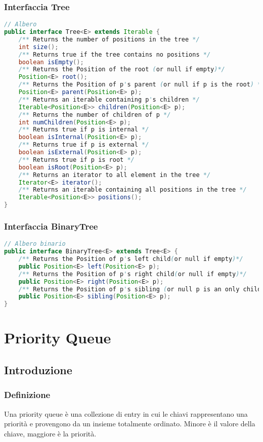 \documentclass[a4paper]{article}
\begin{document}
\subsubsection*{Interfaccia Tree}
\begin{lstlisting}[language=Java]
// Albero
public interface Tree<E> extends Iterable {
	/** Returns the number of positions in the tree */
	int size();
	/** Returns true if the tree contains no positions */
	boolean isEmpty();
	/** Returns the Position of the root (or null if empty)*/
	Position<E> root();
	/** Returns the Position of p's parent (or null if p is the root) */
	Position<E> parent(Position<E> p);
	/** Returns an iterable containing p's children */
	Iterable<Position<E>> children(Position<E> p);
	/** Returns the number of children of p */
	int numChildren(Position<E> p);
	/** Returns true if p is internal */
	boolean isInternal(Position<E> p);
	/** Returns true if p is external */
	boolean isExternal(Position<E> p);
	/** Returns true if p is root */
	boolean isRoot(Position<E> p);
	/** Returns an iterator to all element in the tree */
	Iterator<E> iterator();
	/** Returns an iterable containing all positions in the tree */
	Iterable<Position<E>> positions();
}
\end{lstlisting}

\subsubsection*{Interfaccia BinaryTree}
\begin{lstlisting}[language=Java]
// Albero binario
public interface BinaryTree<E> extends Tree<E> {
	/** Returns the Position of p's left child(or null if empty)*/
	public Position<E> left(Position<E> p);
	/** Returns the Position of p's right child(or null if empty)*/
	public Position<E> right(Position<E> p);
	/** Returns the Position of p's sibling (or null p is an only child)*/
	public Position<E> sibling(Position<E> p);
}
\end{lstlisting}

\newpage

\section{Priority Queue}
\subsection{Introduzione}
\subsubsection*{Definizione}
Una priority queue è una collezione di entry in cui le chiavi rappresentano una priorità e provengono da un insieme totalmente
ordinato. Minore è il valore della chiave, maggiore è la priorità.
\end{document}
